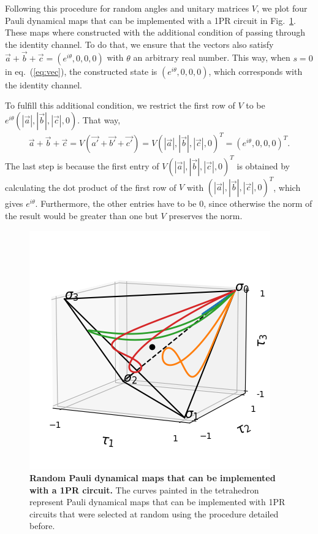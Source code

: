 \documentclass[10pt,letterpaper]{article} %
\newcommand{\fref}[1]{Fig.~\ref{#1}}
\newcommand{\eref}[1]{eq.~(\ref{#1})}
\begin{document}
Following this procedure for random
angles and unitary matrices $V$, 
we plot four Pauli dynamical maps 
that can be implemented with a 1PR circuit in \fref{fig:curves-random}.
These maps where constructed with the additional condition
of passing through the identity channel.
To do that, we ensure that the vectors also satisfy
$\vec{a} + \vec{b} + \vec{c} = (e^{i \theta},0,0,0)$ with $\theta$ an arbitrary
real number.
This way, when $s = 0$ in \eref{eq:vec}, the constructed state
is $(e^{i \theta},0,0,0)$, which
corresponds with the identity channel.

To fulfill this additional condition,  we restrict the first row of
$V$ to be $e^{i\theta} (|\vec{a}|, |\vec{b}|, |\vec{c}|,0)$. 
That way, 
\begin{align*}
\vec{a} + \vec{b} + \vec{c} = V (\vec{a'} + \vec{b'} + \vec{c'}) = V(|\vec{a}|, |\vec{b}|, |\vec{c}|,0)^T = (e^{i\theta},0,0,0)^T.
\end{align*}
The last step is because the first entry of $V(|\vec{a}|, |\vec{b}|, |\vec{c}|,0)^T$
is obtained by calculating the dot product of the first row of $V$ with $(|\vec{a}|, |\vec{b}|, |\vec{c}|,0)^T$, which gives
$e^{i\theta}$. 
Furthermore, the other entries have to be $0$,
since otherwise the norm of the result would be greater than
one but $V$ preserves the norm.

\begin{figure} %
\centering
\includegraphics{images/curvas-azar.png}
\caption{{\bf Random Pauli dynamical maps that can be implemented with a 1PR circuit.}
The curves painted in the tetrahedron
represent Pauli dynamical maps that can be implemented with 1PR circuits
that were selected at random using the procedure detailed before.}
\label{fig:curves-random}
\end{figure}
\end{document}

